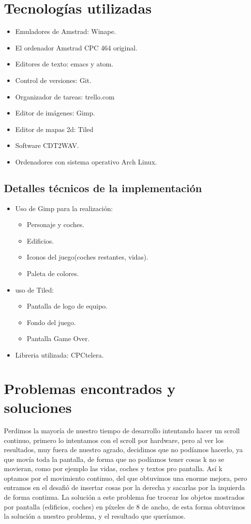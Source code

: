 \documentclass[11pt, spanish]{article}
\begin{document}
\section{Tecnologías utilizadas}
\begin{itemize}
	\item Emuladores de Amstrad: Winape.
	\item El ordenador Amstrad CPC 464 original.
	\item Editores de texto: emacs y atom.
	\item Control de versiones: Git.
	\item Organizador de tareas: trello.com
	\item Editor de imágenes: Gimp.
	\item Editor de mapas 2d: Tiled
	\item Software CDT2WAV.
	\item Ordenadores con sistema operativo Arch Linux.
\end{itemize}

\subsection{Detalles técnicos de la implementación}
\begin{itemize}
	\item Uso de Gimp para la realización:
	\begin{itemize}
		\item Personaje y coches.
		\item Edificios.
		\item Iconos del juego(coches restantes, vidas).
		\item Paleta de colores.
	\end{itemize}
	\item uso de Tiled:
	\begin{itemize}
		\item Pantalla de logo de equipo.
		\item Fondo del juego.
		\item Pantalla Game Over.
	\end{itemize}
	\item Libreria utilizada: CPCtelera.
\end{itemize}

\section{Problemas encontrados y soluciones}
Perdimos la mayoría de nuestro tiempo de desarrollo intentando hacer un scroll continuo, primero lo intentamos con el scroll por hardware, pero al ver los resultados, muy fuera de nuestro agrado, decidimos que no podíamos hacerlo, ya que movía toda la pantalla, de forma que no podíamos tener cosas k no se movieran, como por ejemplo las vidas, coches y textos pro pantalla.
Así k optamos por el movimiento continuo, del que obtuvimos una enorme mejora, pero entramos en el desafió de insertar cosas por la derecha y sacarlas por la izquierda de forma continua.
La solución a este problema fue trocear los objetos mostrados por pantalla (edificios, coches) en píxeles de 8 de ancho, de esta forma obtuvimos la solución a nuestro problema, y el resultado que queríamos.
\end{document}
